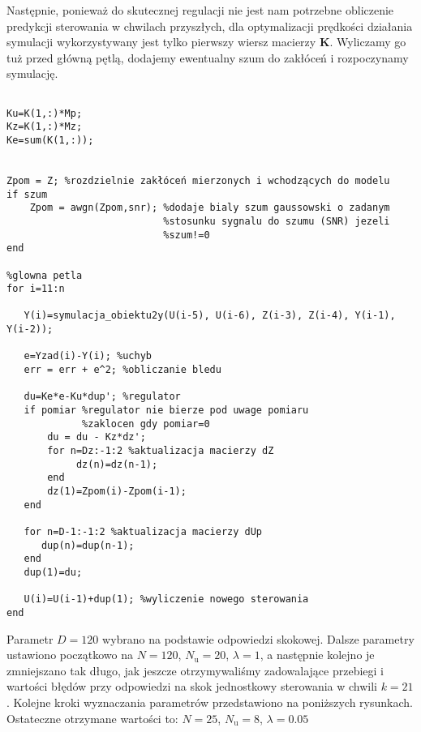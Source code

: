 Następnie, ponieważ do skutecznej regulacji nie jest nam potrzebne obliczenie predykcji sterowania w chwilach przyszłych, dla optymalizacji prędkości działania symulacji wykorzystywany jest tylko pierwszy wiersz macierzy $ \boldsymbol{K} $. Wyliczamy go tuż przed główną pętlą, dodajemy ewentualny szum do zakłóceń i rozpoczynamy symulację.


\begin{lstlisting}[style=Matlab-editor]
%przeksztalcanie wyliczonych macierzy do potrzebnych nam parametrow

Ku=K(1,:)*Mp;
Kz=K(1,:)*Mz;
Ke=sum(K(1,:));


Zpom = Z; %rozdzielnie zakłóceń mierzonych i wchodzących do modelu
if szum
    Zpom = awgn(Zpom,snr); %dodaje bialy szum gaussowski o zadanym
                           %stosunku sygnalu do szumu (SNR) jezeli 
                           %szum!=0
end

%glowna petla
for i=11:n

   Y(i)=symulacja_obiektu2y(U(i-5), U(i-6), Z(i-3), Z(i-4), Y(i-1), Y(i-2));

   e=Yzad(i)-Y(i); %uchyb
   err = err + e^2; %obliczanie bledu

   du=Ke*e-Ku*dup'; %regulator
   if pomiar %regulator nie bierze pod uwage pomiaru 
   			 %zaklocen gdy pomiar=0
       du = du - Kz*dz';
       for n=Dz:-1:2 %aktualizacja macierzy dZ
       		dz(n)=dz(n-1);
       end
       dz(1)=Zpom(i)-Zpom(i-1);
   end

   for n=D-1:-1:2 %aktualizacja macierzy dUp
      dup(n)=dup(n-1);
   end
   dup(1)=du;
   
   U(i)=U(i-1)+dup(1); %wyliczenie nowego sterowania
end
\end{lstlisting}

Parametr $ D = \num{120} $ wybrano na podstawie odpowiedzi skokowej. Dalsze parametry ustawiono początkowo na $ N = \num{120} $, $ N_\mathrm{u} = \num{20} $, $ \lambda = \num{1} $, a następnie kolejno je zmniejszano tak długo, jak jeszcze otrzymywaliśmy zadowalające przebiegi i wartości błędów przy odpowiedzi na skok jednostkowy sterowania w chwili $ k = \num{21} $. Kolejne kroki wyznaczania parametrów przedstawiono na poniższych rysunkach. Ostateczne otrzymane wartości to: $ N = \num{25} $, $ N_\mathrm{u} = \num{8} $, $ \lambda = \num{0,05} $

